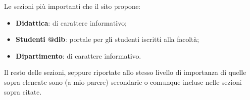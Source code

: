 Le sezioni più importanti che il sito propone:
	\begin{itemize}
		\item \textbf{Didattica}: di carattere informativo;
		\item \textbf{Studenti @dib}: portale per gli studenti iscritti alla facoltà;
		\item \textbf{Dipartimento}: di carattere informativo.
	\end{itemize}
Il resto delle sezioni, seppure riportate allo stesso livello di importanza di quelle sopra elencate sono (a mio parere) secondarie o comunque incluse nelle sezioni sopra citate.